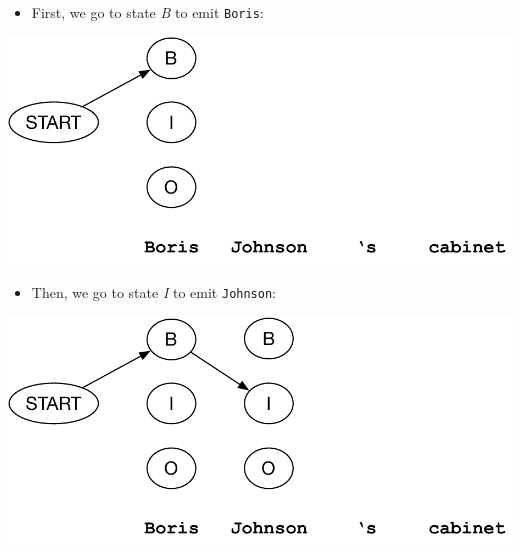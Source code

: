 \documentclass[landscape]{jhuslides3C}
\begin{document}

\vfill
\begin{itemize}
\item First, we go to state {\em B} to emit {\tt Boris}:
\end{itemize}
\vfill
\begin{center}
\includegraphics[scale=1.2]{hmm-search-ne1.pdf}
\end{center}
\vfill



\vfill
\begin{itemize}
\item Then, we go to state {\em I} to emit {\tt Johnson}:
\end{itemize}
\vfill
\begin{center}
\includegraphics[scale=1.2]{hmm-search-ne2.pdf}
\end{center}
\vfill

\end{document}
